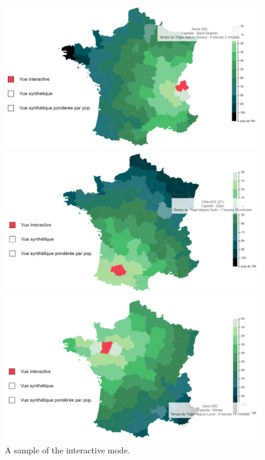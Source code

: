 \documentclass{vgtc}                          %
\begin{document}
\begin{figure}[h]
 \centering %
 \includegraphics[scale=1, width=\columnwidth]{ImageProjet10_01.png}
 
 \vspace{0.4cm}
 \includegraphics[scale=1, width=\columnwidth]{ImageProjet10_01_2.png}
 
  \vspace{0.4cm}
 \includegraphics[scale=1, width=\columnwidth]{ImageProjet10_01_3.png}
 \caption{A sample of the interactive mode.}
 \label{fig:sample}
\end{figure}
\end{document}
